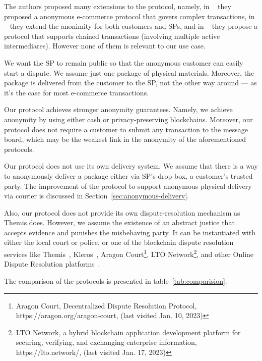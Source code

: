 The authors proposed many extensions to the protocol, namely, in ~\cite{birjoveanuPreservingAnonymityFair2018} they proposed a anonymous e-commerce protocol that govers complex transactions, in ~\cite{birjoveanuAnonymityComplexTransactions2019} they extend the anonimity for both customers and SPs, and in ~\cite{birjoveanuFairExchangeECommerce2020} they propose a protocol that supports chained transactions (involving multiple active intermediares). However none of them is relevant to our use case.

We want the SP to remain public so that the anonymous customer can easily start a dispute. We assume just one package of physical materials. Moreover, the package is delivered from the customer to the SP, not the other way around — as it's the case for most e-commerce transactions.

Our protocol achieves stronger anonymity guarantees. Namely, we achieve anonymity by using either cash or privacy-preserving blockchains. Moreover, our protocol does not require a customer to submit any transaction to the message board, which may be the weakest link in the anonymity of the aforementioned protocols.

Our protocol does not use its own delivery system. We assume that there is a way to anonymously deliver a package either via SP's drop box, a customer's trusted party. The improvement of the protocol to support anonymous physical delivery via courier is discussed in Section~\ref{sec:anonymous-delivery}.

Also, our protocol does not provide its own dispute-resolution mechanism as Themis does. However, we assume the existence of an abstract justice that accepts evidence and punishes the misbehaving party. 
It can be instantiated with either the local court or police, or one of the blockchain
dispute resolution services like Themis~\cite{mengThemisDecentralizedEscrow2019}, Kleros~\cite{bergollaKlerosSociolegalCase2022,gudkovCrowdArbitrationBlockchain2020}, Aragon Court\footnote{Aragon Court, Decentralized Dispute Resolution Protocol, https://aragon.org/aragon-court, (last visited Jan. 10, 2023)}, LTO Network\footnote{LTO Network, a hybrid blockchain application development platform for securing, verifying, and exchanging enterprise information, https://lto.network/, (last visited Jan. 17, 2023)}, and other Online Dispute Resolution platforms~\cite{allenGovernanceBlockchainDispute2019}.

The comparison of the protocols is presented in table~\ref{tab:comparision}.



